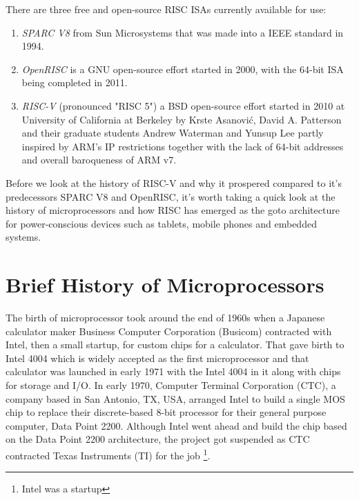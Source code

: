\documentclass[journal]{IEEEtran}
\begin{document}
There are three free and open-source RISC ISAs currently available for use:
\begin{enumerate}
    \item \emph{SPARC V8} from Sun Microsystems that was made into a IEEE standard in 1994.
    \item \emph{OpenRISC} is a GNU open-source effort started in 2000, with the 64-bit ISA being completed in 2011.
    \item \emph{RISC-V} (pronounced "RISC 5") a BSD open-source effort started in 2010 at University of California at Berkeley by Krste Asanović, David A. Patterson and their graduate students Andrew Waterman and Yunsup Lee  partly inspired by ARM's IP restrictions together with the lack of 64-bit addresses and overall baroqueness of ARM v7.
\end{enumerate}

Before we look at the history of RISC-V and why it prospered compared to it's predecessors SPARC V8 and OpenRISC, it's worth taking a quick look at the history of microprocessors and how RISC has emerged as the goto architecture for power-conscious devices such as tablets, mobile phones and embedded systems.

\section{Brief History of Microprocessors}

The birth of microprocessor took around the end of 1960s when a Japanese calculator maker Business Computer Corporation (Busicom) contracted with Intel, then a small startup, for custom chips for a calculator. That gave birth to Intel 4004 which is widely accepted as the first microprocessor and that calculator was launched in early 1971 with the Intel 4004 in it along with chips for storage and I/O. In early 1970, Computer Terminal Corporation (CTC), a company based in San Antonio, TX, USA, arranged Intel to build a single MOS chip to replace their discrete-based 8-bit processor for their general purpose computer, Data Point 2200. Although Intel went ahead and build the chip based on the Data Point 2200 architecture, the project got suspended as CTC contracted Texas Instruments (TI) for the job \footnote{Intel was a startup}. 

\ifCLASSOPTIONcaptionsoff
  \newpage
\fi



\end{document}
